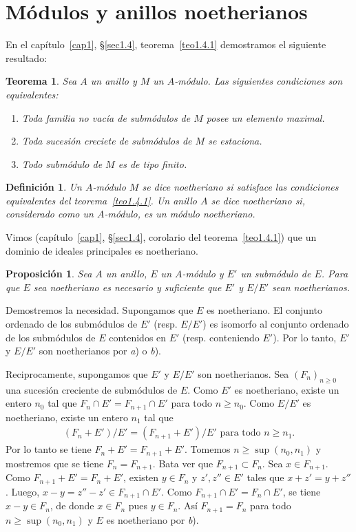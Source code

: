 \documentclass[bibtotoc,leqno,spanish]{amsbook}
\numberwithin{equation}{section}
\theoremstyle{note}
\newtheorem{definition}{Definici\'on}
\theoremstyle{note}
\newtheorem{theorem}{Teorema}
\newtheorem{proposition}{Proposici\'on}
\theoremstyle{rem}
\numberwithin{theorem}{section}
\numberwithin{proposition}{section}
\numberwithin{definition}{section}
\numberwithin{lemma}{section}
\numberwithin{corollary}{section}
\numberwithin{example}{section}
\numberwithin{footnote}{section}%
\begin{document}
\section{M\'odulos y anillos noetherianos}\label{sec3.1}

En el cap\'itulo~\ref{cap1}, \S\ref{sec1.4}, teorema~\ref{teo1.4.1} demostramos el siguiente resultado:

\begin{theorem}\label{teo3.1.1}
Sea $A$ un anillo y $M$ un $A$-m\'odulo. Las siguientes condiciones son equivalentes:
\begin{enumerate}
\item[a)] Toda familia no vac\'ia de subm\'odulos de $M$ posee un elemento maximal.
\item[b)] Toda sucesi\'on creciete de subm\'odulos de $M$ se estaciona.
\item[c)] Todo subm\'odulo de $M$ es de tipo finito.
\end{enumerate}
\end{theorem}

\begin{definition}
Un $A$-m\'odulo $M$ se dice noetheriano si satisface las condiciones equivalentes del
teorema~\ref{teo1.4.1}. Un anillo $A$ se dice noetheriano si, considerado como un $A$-m\'odulo, es
un m\'odulo noetheriano.
\end{definition}

Vimos (cap\'itulo~\ref{cap1}, \S\ref{sec1.4}, corolario del teorema~\ref{teo1.4.1}) que un
dominio de ideales principales es noetheriano.

\begin{proposition}\label{prop3.1.1}
Sea $A$ un anillo, $E$ un $A$-m\'odulo y $E'$ un subm\'odulo de $E$. Para que $E$ sea
noetheriano es necesario y suficiente que $E'$ y $E/E'$ sean noetherianos.
\end{proposition}

Demostremos la necesidad. Supongamos que $E$ es noetheriano. El conjunto ordenado de los
subm\'odulos de $E'$ (resp. $E/E'$) es isomorfo al conjunto ordenado de los subm\'odulos de $E$
contenidos en $E'$ (resp. conteniendo $E'$). Por lo tanto, $E'$ y $E/E'$ son noetherianos por {\itshape a})
o {\itshape b}).

Reciprocamente, supongamos que $E'$ y $E/E'$ son noetherianos. Sea $(F_{n})_{n\geq 0}$ una
sucesi\'on creciente de subm\'odulos de $E$. Como $E'$ es noetheriano, existe un entero
$n_{0}$ tal que $F_{n}\cap E' = F_{n+1}\cap E'$ para todo $n\geq n_{0}$. Como $E/E'$ es noetheriano,
existe un entero $n_{1}$ tal que
\begin{gather*}
(F_{n}+E')/E' = (F_{n+1}+E')/E'\text{ para todo }n\geq n_{1}.
\end{gather*}
Por lo tanto se tiene $F_{n}+E'=  F_{n+1}+E'$. Tomemos $n\geq\sup(n_{0},n_{1})$ y mostremos
que se tiene $F_{n} = F_{n+1}$. Bata ver que $F_{n+1}\subset F_{n}$. Sea $x\in F_{n+1}$.
Como $F_{n+1}+E' = F_{n}+E'$, existen $y\in F_{n}$ y $z',z''\in E'$ tales que
$x+z' = y+z''$. Luego, $x-y = z''-z'\in F_{n+1}\cap E'$. Como $F_{n+1}\cap E' = F_{n}\cap E'$,
se tiene $x-y\in F_{n}$, de donde $x\in F_{n}$ pues $y\in F_{n}$. As\'i $F_{n+1} = F_{n}$ para
todo $n\geq \sup(n_{0},n_{1})$ y $E$ es noetheriano por {\itshape b}).
\end{document}
